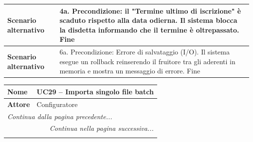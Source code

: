 \documentclass[12pt, a4paper, oneside]{report}
\begin{document}
\begin{tabularx}{\textwidth}{|l|X|}
    \textbf{Scenario alternativo} & 
    4a. Precondizione: il "Termine ultimo di iscrizione" è scaduto rispetto alla data odierna.\newline
    Il sistema blocca la disdetta informando che il termine è oltrepassato. \newline
    Fine \\ \hline

    \textbf{Scenario alternativo} & 
    6a. Precondizione: Errore di salvataggio (I/O).\newline
    Il sistema esegue un rollback reinserendo il fruitore tra gli aderenti in memoria e mostra un messaggio di errore. \newline
    Fine \\ \hline
\end{tabularx}

\begin{tabularx}{\textwidth}{|l|X|}
    \hline
    \textbf{Nome} & \textbf{UC29 – Importa singolo file batch} \\ \hline
    \textbf{Attore} & Configuratore \\ \hline
    \endfirsthead 

    \hline
    \multicolumn{2}{|l|}{\textit{Continua dalla pagina precedente...}} \\ \hline
    \endhead 

    \hline
    \multicolumn{2}{|r|}{\textit{Continua nella pagina successiva...}} \\ \hline
    \endfoot 

    \hline
    \endlastfoot


\end{tabularx}
\end{document}
